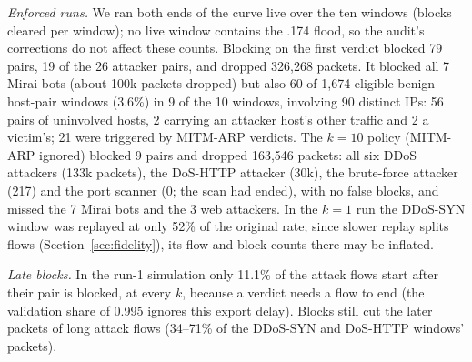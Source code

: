 \emph{Enforced runs.} We ran both ends of the curve live over the ten windows (blocks cleared per window); no live window contains the .174 flood, so the audit's corrections do not affect these counts. Blocking on the first verdict blocked 79 pairs, 19 of the 26 attacker pairs, and dropped 326,268 packets. It blocked all 7 Mirai bots (about 100k packets dropped) but also 60 of 1,674 eligible benign host-pair windows (3.6\%) in 9 of the 10 windows, involving 90 distinct IPs: 56 pairs of uninvolved hosts, 2 carrying an attacker host's other traffic and 2 a victim's; 21 were triggered by MITM-ARP verdicts. The $k=10$ policy (MITM-ARP ignored) blocked 9 pairs and dropped 163,546 packets: all six DDoS attackers (133k packets), the DoS-HTTP attacker (30k), the brute-force attacker (217) and the port scanner (0; the scan had ended), with no false blocks, and missed the 7 Mirai bots and the 3 web attackers. In the $k=1$ run the DDoS-SYN window was replayed at only 52\% of the original rate; since slower replay splits flows (Section~\ref{sec:fidelity}), its flow and block counts there may be inflated.

\emph{Late blocks.} In the run-1 simulation only 11.1\% of the attack flows start after their pair is blocked, at every $k$, because a verdict needs a flow to end (the validation share of 0.995 ignores this export delay). Blocks still cut the later packets of long attack flows (34--71\% of the DDoS-SYN and DoS-HTTP windows' packets).
